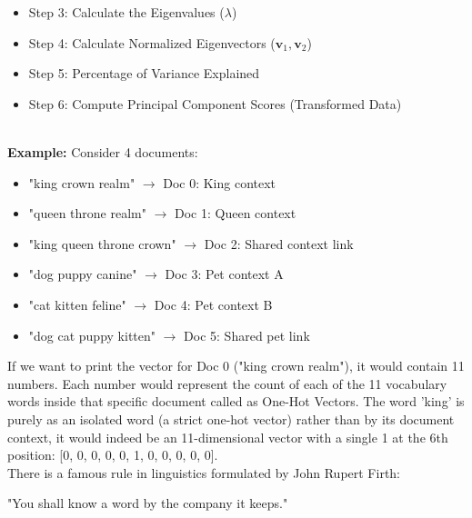 \documentclass[DIV=20,oneside]{scrartcl}
\newcommand{\example}{
	\noindent\textbf{\\Example: }
}
\begin{document}
\begin{itemize}
	Scaling $AA^T$ by $\frac{1}{n - 1}$ gives the $p \times p$ sample covariance matrix:$$\boldsymbol{\Sigma}_{\text{cov}} = \frac{1}{n - 1} AA^T$$
	\item Step 3: Calculate the Eigenvalues ($\lambda$)
	\item Step 4: Calculate Normalized Eigenvectors ($\mathbf{v}_1, \mathbf{v}_2$)
	\item Step 5: Percentage of Variance Explained
	\item Step 6: Compute Principal Component Scores (Transformed Data)
\end{itemize} 

\example Consider 4 documents:
\begin{itemize}
	\item "king crown realm" $\rightarrow$ Doc 0: King context
	\item "queen throne realm" $\rightarrow$ Doc 1: Queen context
	\item "king queen throne crown" $\rightarrow$ Doc 2: Shared context link
	\item "dog puppy canine" $\rightarrow$ Doc 3: Pet context A
	\item "cat kitten feline" $\rightarrow$ Doc 4: Pet context B
	\item "dog cat puppy kitten" $\rightarrow$ Doc 5: Shared pet link
\end{itemize}
If we want to print the vector for Doc 0 ("king crown realm"), it would contain 11 numbers. Each number would represent the count of each of the 11 vocabulary words inside that specific document called as One-Hot Vectors. The word 'king' is purely as an isolated word (a strict one-hot vector) rather than by its document context, it would indeed be an 11-dimensional vector with a single 1 at the 6th position: [0, 0, 0, 0, 0, 1, 0, 0, 0, 0, 0].\\
There is a famous rule in linguistics formulated by John Rupert Firth:

"You shall know a word by the company it keeps."
\end{document}
